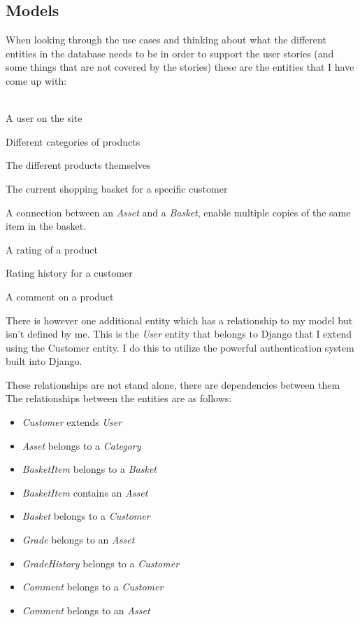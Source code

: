 \documentclass[12pt, a4paper,titlepage]{article}
\begin{document}
\subsection{Models}
\label{sec:models}
When looking through the use cases and thinking about what the different
entities in the database needs to be in order to support the user stories 
(and some things that are not covered by the stories) these are the entities
that I have come up with:
\\\\
\begin{description}
\setlength\itemsep{-7pt}
\item [Customer] A user on the site
\item [Category] Different categories of products
\item [Asset] The different products themselves
\item [Basket] The current shopping basket for a specific customer
\item [BasketItem] A connection between an \emph{Asset} and a \emph{Basket}, enable multiple copies of the same item in the basket.
\item [Grade] A rating of a product
\item [GradeHistory] Rating history for a customer
\item [Comment] A comment on a product
\end{description}
There is however one additional entity which has a relationship to my model
but isn't defined by me.
This is the \emph{User} entity that belongs to Django that I
extend using the Customer entity. I do this to utilize the powerful 
authentication system built into Django.

These relationships are not stand alone, there are dependencies between them
The relationships between the entities are as follows:
\begin{itemize}
\setlength\itemsep{-7pt}
\item \emph{Customer} extends \emph{User}
\item \emph{Asset} belongs to a \emph{Category}
\item \emph{BasketItem} belongs to a \emph{Basket}
\item \emph{BasketItem} contains an \emph{Asset}
\item \emph{Basket} belongs to a \emph{Customer}
\item \emph{Grade} belongs to an \emph{Asset}
\item \emph{GradeHistory} belongs to a \emph{Customer}
\item \emph{Comment} belongs to a \emph{Customer}
\item \emph{Comment} belongs to an \emph{Asset}
\end{itemize}
\end{document}
